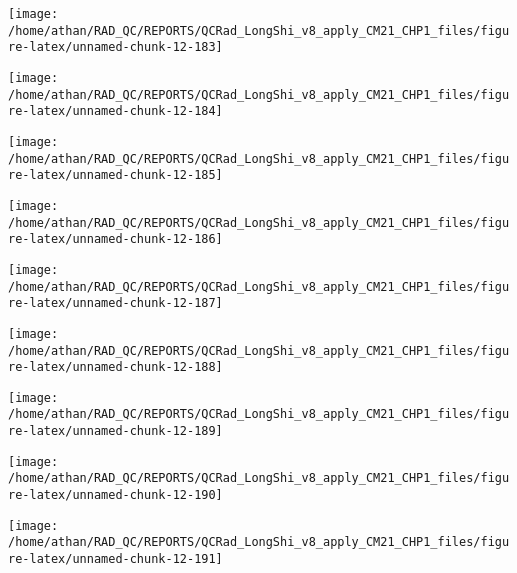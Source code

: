 \documentclass[
  10pt,
  a4paper,oneside]{article}
\begin{document}
\begin{center}\texttt{[image: /home/athan/RAD\_QC/REPORTS/QCRad\_LongShi\_v8\_apply\_CM21\_CHP1\_files/figure-latex/unnamed-chunk-12-183]} \end{center}

\begin{center}\texttt{[image: /home/athan/RAD\_QC/REPORTS/QCRad\_LongShi\_v8\_apply\_CM21\_CHP1\_files/figure-latex/unnamed-chunk-12-184]} \end{center}

\begin{center}\texttt{[image: /home/athan/RAD\_QC/REPORTS/QCRad\_LongShi\_v8\_apply\_CM21\_CHP1\_files/figure-latex/unnamed-chunk-12-185]} \end{center}

\begin{center}\texttt{[image: /home/athan/RAD\_QC/REPORTS/QCRad\_LongShi\_v8\_apply\_CM21\_CHP1\_files/figure-latex/unnamed-chunk-12-186]} \end{center}

\begin{center}\texttt{[image: /home/athan/RAD\_QC/REPORTS/QCRad\_LongShi\_v8\_apply\_CM21\_CHP1\_files/figure-latex/unnamed-chunk-12-187]} \end{center}

\begin{center}\texttt{[image: /home/athan/RAD\_QC/REPORTS/QCRad\_LongShi\_v8\_apply\_CM21\_CHP1\_files/figure-latex/unnamed-chunk-12-188]} \end{center}

\begin{center}\texttt{[image: /home/athan/RAD\_QC/REPORTS/QCRad\_LongShi\_v8\_apply\_CM21\_CHP1\_files/figure-latex/unnamed-chunk-12-189]} \end{center}

\begin{center}\texttt{[image: /home/athan/RAD\_QC/REPORTS/QCRad\_LongShi\_v8\_apply\_CM21\_CHP1\_files/figure-latex/unnamed-chunk-12-190]} \end{center}

\begin{center}\texttt{[image: /home/athan/RAD\_QC/REPORTS/QCRad\_LongShi\_v8\_apply\_CM21\_CHP1\_files/figure-latex/unnamed-chunk-12-191]} \end{center}
\end{document}
